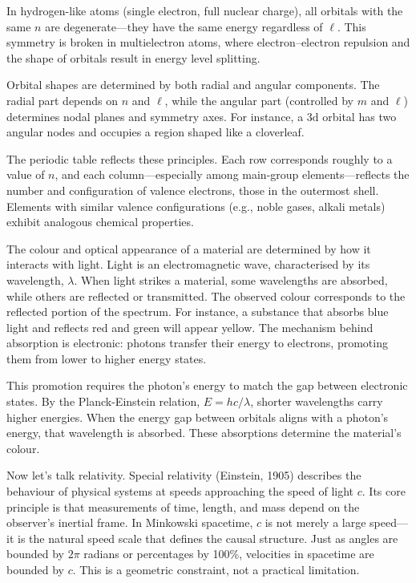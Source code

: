 In hydrogen-like atoms (single electron, full nuclear charge), all orbitals with the same $n$ are degenerate—they have the same energy regardless of $\ell$. This symmetry is broken in multielectron atoms, where electron–electron repulsion and the shape of orbitals result in energy level splitting.

Orbital shapes are determined by both radial and angular components. The radial part depends on $n$ and $\ell$, while the angular part (controlled by $m$ and $\ell$) determines nodal planes and symmetry axes. For instance, a $3\mathrm{d}$ orbital has two angular nodes and occupies a region shaped like a cloverleaf.


The periodic table reflects these principles. Each row corresponds roughly to a value of $n$, and each column—especially among main-group elements—reflects the number and configuration of valence electrons, those in the outermost shell. Elements with similar valence configurations (e.g., noble gases, alkali metals) exhibit analogous chemical properties.


The colour and optical appearance of a material are determined by how it interacts with light. Light is an electromagnetic wave, characterised by its wavelength, \( \lambda \). When light strikes a material, some wavelengths are absorbed, while others are reflected or transmitted. The observed colour corresponds to the reflected portion of the spectrum. For instance, a substance that absorbs blue light and reflects red and green will appear yellow. The mechanism behind absorption is electronic: photons transfer their energy to electrons, promoting them from lower to higher energy states.

This promotion requires the photon's energy to match the gap between electronic states. By the Planck-Einstein relation, $E = hc/\lambda$, shorter wavelengths carry higher energies. When the energy gap between orbitals aligns with a photon's energy, that wavelength is absorbed. These absorptions determine the material's colour.

Now let's talk relativity. Special relativity (Einstein, 1905) describes the behaviour of physical systems at speeds approaching the speed of light \( c \). Its core principle is that measurements of time, length, and mass depend on the observer's inertial frame. In Minkowski spacetime, \( c \) is not merely a large speed—it is the natural speed scale that defines the causal structure. Just as angles are bounded by \( 2\pi \) radians or percentages by 100\%, velocities in spacetime are bounded by \( c \). This is a geometric constraint, not a practical limitation.

